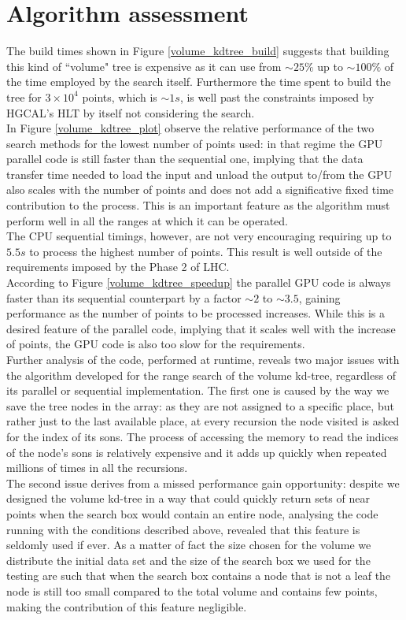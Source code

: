 \section{Algorithm assessment}
The build times shown in Figure \ref{volume_kdtree_build} suggests that building this kind of ``volume" tree is expensive as it can use from $\sim 25\%$ up to $\sim 100\%$ of the time employed by the search itself. Furthermore the time spent to build the tree for $3 \times 10^{4}$ points, which is $\sim 1\unit{s}$, is well past the constraints imposed by HGCAL's HLT by itself not considering the search.\\
In Figure \ref{volume_kdtree_plot} observe the relative performance of the two search methods for the lowest number of points used: in that regime the GPU parallel code is still faster than the sequential one, implying that the data transfer time needed to load the input and unload the output to/from the GPU also scales with the number of points and does not add a significative fixed time contribution to the process. This is an important feature as the algorithm must perform well in all the ranges at which it can be operated.\\
The CPU sequential timings, however, are not very encouraging requiring up to $5.5 \unit{s}$ to process the highest number of points. This result is well outside of the requirements imposed by the Phase 2 of LHC.\\
According to Figure \ref{volume_kdtree_speedup} the parallel GPU code is always faster than its sequential counterpart by a factor $\sim 2$ to $\sim 3.5$, gaining performance as the number of points to be processed increases. While this is a desired feature of the parallel code, implying that it scales well with the increase of points, the GPU code is also too slow for the requirements.\\
Further analysis of the code, performed at runtime, reveals two major issues with the algorithm developed for the range search of the volume kd-tree, regardless of its parallel or sequential implementation. The first one is caused by the way we save the tree nodes in the array: as they are not assigned to a specific place, but rather just to the last available place, at every recursion the node visited is asked for the index of its sons. The process of accessing the memory to read the indices of the node's sons is relatively expensive and it adds up quickly when repeated millions of times in all the recursions.\\
The second issue derives from a missed performance gain opportunity: despite we designed the volume kd-tree in a way that could quickly return sets of near points when the search box would contain an entire node, analysing the code running with the conditions described above, revealed that this feature is seldomly used if ever. As a matter of fact the size chosen for the volume we distribute the initial data set and the size of the search box we used for the testing are such that when the search box contains a node that is not a leaf the node is still too small compared to the total volume and contains few points, making the contribution of this feature negligible.\\
